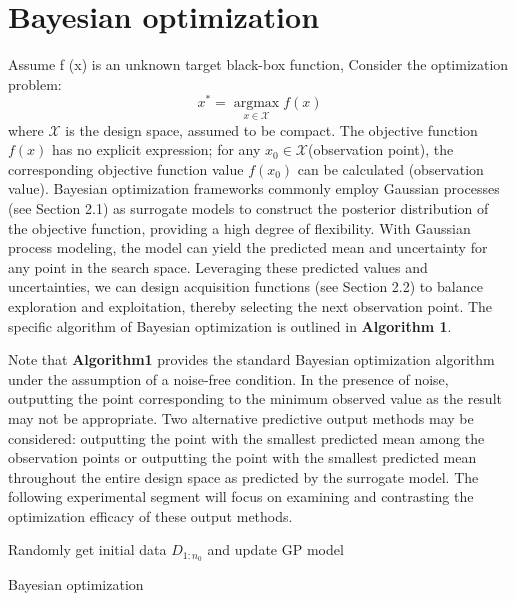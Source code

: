 \documentclass{article}
\begin{document}
\section{Bayesian optimization}
\hspace{2em}Assume f (x) is an unknown target black-box function, Consider the optimization problem:
\begin{equation}\label{eq1}
	x^* = \mathop{\arg\max}\limits_{x \in \mathcal{X}} f(x)
\end{equation}
where $\mathcal{X}$ is the design space, assumed to be compact. The objective function $f(x)$ has no explicit expression; for any  $x_0 \in \mathcal{X}$(observation point), the corresponding objective function value $f(x_0)$ can be calculated (observation value). Bayesian optimization frameworks commonly employ Gaussian processes (see Section 2.1) as surrogate models to construct the posterior distribution of the objective function, providing a high degree of flexibility. With Gaussian process modeling, the model can yield the predicted mean and uncertainty for any point in the search space. Leveraging these predicted values and uncertainties, we can design acquisition functions (see Section 2.2) to balance exploration and exploitation, thereby selecting the next observation point. The specific algorithm of Bayesian optimization is outlined in \textbf{Algorithm 1}.

\hspace{2em}
Note that \textbf{Algorithm1} provides the standard Bayesian optimization algorithm under the assumption of a noise-free condition. In the presence of noise, outputting the point corresponding to the minimum observed value as the result may not be appropriate. Two alternative predictive output methods may be considered: outputting the point with the smallest predicted mean among the observation points or outputting the point with the smallest predicted mean throughout the entire design space as predicted by the surrogate model. The following experimental segment will focus on examining and contrasting the optimization efficacy of these output methods.
\begin{algorithm}[htb]
    \SetAlgoLined
  
    Randomly get initial data $D_{1:n_0}$ and update GP model\;
    \caption{Bayesian optimization}
\end{algorithm}
\end{document}

